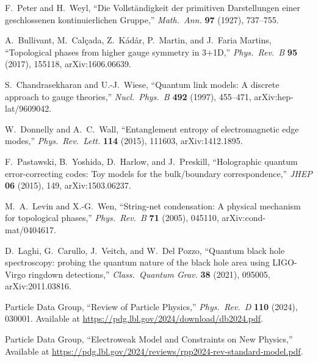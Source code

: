 F.~Peter and H.~Weyl,
``Die Vollst\"andigkeit der primitiven Darstellungen einer geschlossenen kontinuierlichen Gruppe,''
\emph{Math.\ Ann.} \textbf{97} (1927), 737--755.

A.~Bullivant, M.~Cal\c{c}ada, Z.~K\'ad\'ar, P.~Martin, and J.~Faria Martins,
``Topological phases from higher gauge symmetry in 3+1D,''
\emph{Phys.\ Rev.\ B} \textbf{95} (2017), 155118,
arXiv:1606.06639.

S.~Chandrasekharan and U.-J.~Wiese,
``Quantum link models: A discrete approach to gauge theories,''
\emph{Nucl.\ Phys.\ B} \textbf{492} (1997), 455--471,
arXiv:hep-lat/9609042.

W.~Donnelly and A.~C.~Wall,
``Entanglement entropy of electromagnetic edge modes,''
\emph{Phys.\ Rev.\ Lett.} \textbf{114} (2015), 111603,
arXiv:1412.1895.

F.~Pastawski, B.~Yoshida, D.~Harlow, and J.~Preskill,
``Holographic quantum error-correcting codes: Toy models for the bulk/boundary correspondence,''
\emph{JHEP} \textbf{06} (2015), 149,
arXiv:1503.06237.

M.~A.~Levin and X.-G.~Wen,
``String-net condensation: A physical mechanism for topological phases,''
\emph{Phys.\ Rev.\ B} \textbf{71} (2005), 045110,
arXiv:cond-mat/0404617.

D.~Laghi, G.~Carullo, J.~Veitch, and W.~Del Pozzo,
``Quantum black hole spectroscopy: probing the quantum nature of the black hole area using LIGO-Virgo ringdown detections,''
\emph{Class.\ Quantum Grav.} \textbf{38} (2021), 095005,
arXiv:2011.03816.

Particle Data Group,
``Review of Particle Physics,''
\emph{Phys.\ Rev.\ D} \textbf{110} (2024), 030001.
Available at \url{https://pdg.lbl.gov/2024/download/db2024.pdf}.

Particle Data Group,
``Electroweak Model and Constraints on New Physics,''
Available at \url{https://pdg.lbl.gov/2024/reviews/rpp2024-rev-standard-model.pdf}.
